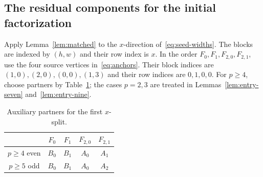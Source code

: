 \documentclass[11pt,reqno]{amsart}
\numberwithin{equation}{section}
\theoremstyle{definition}
\theoremstyle{remark}
\begin{document}
\subsection{The residual components for the initial factorization}
Apply Lemma~\ref{lem:matched} to the $x$-direction of~\eqref{eq:seed-widths}.
The blocks are indexed by $(h,w)$ and their row index is $x$. In the order
$F_0,F_1,F_{2,0},F_{2,1}$, use the four source vertices in~\eqref{eq:anchors}.
Their block indices are $(1,0),(2,0),(0,0),(1,3)$ and their row indices are
$0,1,0,0$. For $p\ge4$, choose partners by Table~\ref{tab:mates}; the cases
$p=2,3$ are treated in Lemmas~\ref{lem:entry-seven} and~\ref{lem:entry-nine}.

\begin{table}[htbp]
\centering
\caption{Auxiliary partners for the first $x$-split.}\label{tab:mates}
\begin{tabular}{ccccc}
\toprule
& $F_0$ & $F_1$ & $F_{2,0}$ & $F_{2,1}$\\
\midrule
$p\ge4$ even & $B_0$ & $B_1$ & $A_0$ & $A_1$\\
$p\ge5$ odd & $B_0$ & $B_1$ & $A_0$ & $A_2$\\
\bottomrule
\end{tabular}
\end{table}
\end{document}
